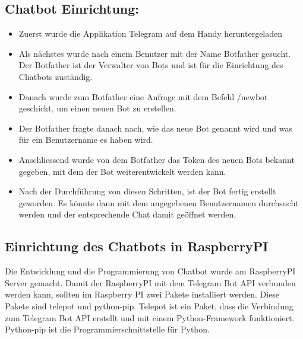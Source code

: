 \subsection{Chatbot Einrichtung:}
\begin{itemize}
	\item Zuerst wurde die Applikation Telegram auf dem Handy heruntergeladen
\end{itemize}
\begin{itemize}
	\item Als nächstes wurde nach einem Benutzer mit der Name Botfather gesucht. Der Botfather ist der Verwalter von Bots und ist für die Einrichtung des Chatbots zuständig.
\end{itemize}
\begin{itemize}
	\item Danach wurde zum Botfather eine Anfrage mit dem Befehl /newbot geschickt, um einen neuen Bot zu erstellen. 
\end{itemize}
\begin{itemize}
	\item Der Botfather fragte danach nach, wie das neue Bot genannt wird und was für ein Benutzername es haben wird.  
\end{itemize}
\begin{itemize}
	\item Anschliessend wurde von dem Botfather das Token des neuen Bots bekannt gegeben, mit dem der Bot weiterentwickelt werden kann. 
\end{itemize}
\begin{itemize}
	\item Nach der Durchführung von diesen Schritten, ist der Bot fertig erstellt geworden. Es könnte dann mit dem angegebenen Benutzernamen durchsucht werden und der entsprechende Chat damit geöffnet werden. 
\end{itemize}
\subsection{Einrichtung des Chatbots in RaspberryPI}
Die Entwicklung und die Programmierung von Chatbot wurde am RaspberryPI Server gemacht. Damit der RaspberryPI mit dem Telegram Bot API verbunden werden kann, sollten im Raspberry PI zwei Pakete installiert werden. Diese Pakete sind telepot und python-pip. Telepot ist ein Paket, dass die Verbindung zum Telegram Bot API erstellt und mit einem Python-Framework funktioniert. Python-pip ist die Programmierschnittstelle für Python.\cite{50_telegram}
